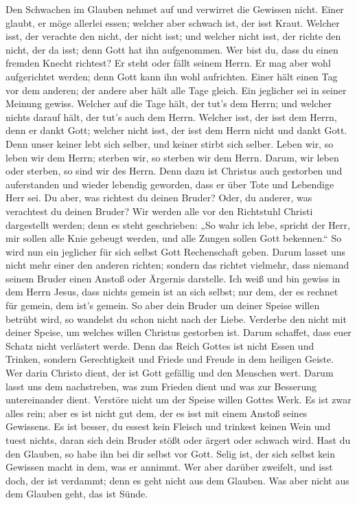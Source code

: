  Den Schwachen im Glauben nehmet auf und verwirret die
Gewissen nicht.  Einer glaubt, er möge allerlei essen;
welcher aber schwach ist, der isst Kraut.  Welcher isst,
der verachte den nicht, der nicht isst; und welcher nicht isst, der
richte den nicht, der da isst; denn Gott hat ihn aufgenommen.
 Wer bist du, dass du einen fremden Knecht richtest? Er
steht oder fällt seinem Herrn. Er mag aber wohl aufgerichtet werden;
denn Gott kann ihn wohl aufrichten.  Einer hält einen Tag
vor dem anderen; der andere aber hält alle Tage gleich. Ein jeglicher
sei in seiner Meinung gewiss.  Welcher auf die Tage hält,
der tut's dem Herrn; und welcher nichts darauf hält, der tut's auch dem
Herrn. Welcher isst, der isst dem Herrn, denn er dankt Gott; welcher
nicht isst, der isst dem Herrn nicht und dankt Gott.  Denn
unser keiner lebt sich selber, und keiner stirbt sich selber.
 Leben wir, so leben wir dem Herrn; sterben wir, so
sterben wir dem Herrn. Darum, wir leben oder sterben, so sind wir des
Herrn.  Denn dazu ist Christus auch gestorben und
auferstanden und wieder lebendig geworden, dass er über Tote und
Lebendige Herr sei.  Du aber, was richtest du deinen
Bruder? Oder, du anderer, was verachtest du deinen Bruder? Wir werden
alle vor den Richtstuhl Christi dargestellt werden;  denn
es steht geschrieben: „So wahr ich lebe, spricht der Herr, mir sollen
alle Knie gebeugt werden, und alle Zungen sollen Gott bekennen.``
 So wird nun ein jeglicher für sich selbst Gott
Rechenschaft geben.  Darum lasset uns nicht mehr einer
den anderen richten; sondern das richtet vielmehr, dass niemand seinem
Bruder einen Anstoß oder Ärgernis darstelle.  Ich weiß
und bin gewiss in dem Herrn Jesus, dass nichts gemein ist an sich
selbst; nur dem, der es rechnet für gemein, dem ist's gemein.
 So aber dein Bruder um deiner Speise willen betrübt
wird, so wandelst du schon nicht nach der Liebe. Verderbe den nicht mit
deiner Speise, um welches willen Christus gestorben ist. 
Darum schaffet, dass euer Schatz nicht verlästert werde. 
Denn das Reich Gottes ist nicht Essen und Trinken, sondern Gerechtigkeit
und Friede und Freude in dem heiligen Geiste.  Wer darin
Christo dient, der ist Gott gefällig und den Menschen wert.
 Darum lasst uns dem nachstreben, was zum Frieden dient
und was zur Besserung untereinander dient.  Verstöre
nicht um der Speise willen Gottes Werk. Es ist zwar alles rein; aber es
ist nicht gut dem, der es isst mit einem Anstoß seines Gewissens.
 Es ist besser, du essest kein Fleisch und trinkest
keinen Wein und tuest nichts, daran sich dein Bruder stößt oder ärgert
oder schwach wird.  Hast du den Glauben, so habe ihn bei
dir selbst vor Gott. Selig ist, der sich selbst kein Gewissen macht in
dem, was er annimmt.  Wer aber darüber zweifelt, und isst
doch, der ist verdammt; denn es geht nicht aus dem Glauben. Was aber
nicht aus dem Glauben geht, das ist Sünde.

